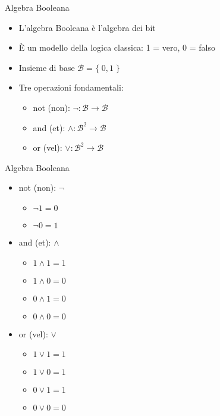 \begin{frame}{Algebra Booleana}
  \vfill
  \begin{itemize}
    \item L'algebra Booleana è l'algebra dei bit
    \vfill
    \item È un \alert{modello} della logica classica: 1 = vero, 0 = falso
    \vfill
    \item Insieme di base \(\mathcal{B} = \{ \; 0, 1 \; \}\)
    \vfill
    \item Tre operazioni fondamentali:
    \begin{itemize}
      \item \alert{not} (non): \(\lnot : \mathcal{B} \to \mathcal{B}\)
      \item \alert{and} (et): \(\land : \mathcal{B}^2 \to \mathcal{B}\)
      \item \alert{or} (vel): \(\lor : \mathcal{B}^2 \to \mathcal{B}\)
    \end{itemize}
  \end{itemize}
  \vfill
\end{frame}

\begin{frame}{Algebra Booleana}
  \begin{itemize}
      \item \alert{not} (non): \(\lnot\)
      \begin{itemize}
        \item \(\lnot 1 = 0\)
        \item \(\lnot 0 = 1\)
      \end{itemize}
      \vfill
      \item \alert{and} (et): \(\land\)
      \begin{itemize}
        \item \(1 \land 1 = 1\)
        \item \(1 \land 0 = 0\)
        \item \(0 \land 1 = 0\)
        \item \(0 \land 0 = 0\)
      \end{itemize}
      \vfill
      \item \alert{or} (vel): \(\lor\)
      \begin{itemize}
        \item \(1 \lor 1 = 1\)
        \item \(1 \lor 0 = 1\)
        \item \(0 \lor 1 = 1\)
        \item \(0 \lor 0 = 0\)
      \end{itemize}
  \end{itemize}
\end{frame}

